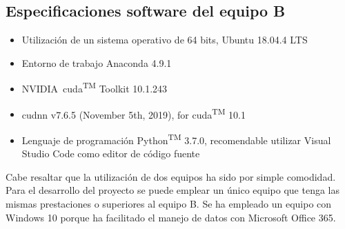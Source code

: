 \subsection{Especificaciones software del equipo B}
\label{subsec:especificaciones-software-equipob}
\begin{itemize}
    \item Utilización de un sistema operativo de 64 bits, Ubuntu 18.04.4 LTS
    \item Entorno de trabajo Anaconda 4.9.1
    \item NVIDIA\textregistered\ \gls{cuda}\textsuperscript{TM} Toolkit 10.1.243 
    \item \gls{cudnn} v7.6.5 (November 5th, 2019), for \gls{cuda}\textsuperscript{TM} 10.1
    \item Lenguaje de programación Python\textsuperscript{TM} 3.7.0, recomendable utilizar Visual Studio Code como editor de código fuente
\end{itemize}

Cabe resaltar que la utilización de dos equipos ha sido por simple comodidad. Para el desarrollo del proyecto se puede emplear un único equipo que tenga las mismas prestaciones o superiores al equipo B. Se ha empleado un equipo con Windows 10 porque ha facilitado el manejo de datos con Microsoft Office 365.